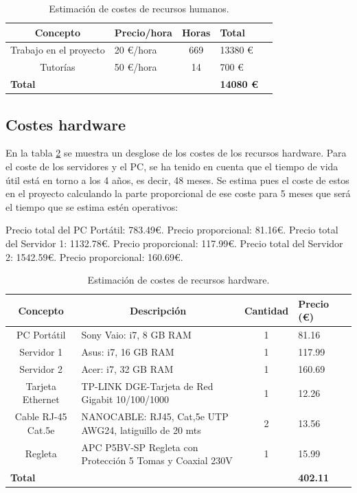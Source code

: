 \renewcommand\arraystretch{1.1}
\begin{table}[!h]
\centering
\begin{adjustbox}{max width=\textwidth}
\begin{tabular}{|c|l|c|l|c|}
\hline
\textbf{Concepto} & \textbf{Precio/hora} & \textbf{Horas} & \textbf{Total}   \\
\hline \hline
Trabajo en el proyecto & 20 \euro/hora & 669 & 13380 \euro \\
\hline
Tutorías & 50 \euro/hora & 14 & 700 \euro \\
\hline
\multicolumn{3}{|l|}{\textbf{Total}} & \textbf{14080 \euro} \\
\hline
\end{tabular}
\end{adjustbox}
\caption{Estimación de costes de recursos humanos.}
\label{tab:coste-recursos-humanos}
\end{table}


\subsection{Costes hardware}
En la tabla \ref{tab:costes-hardware} se muestra un desglose de los costes de los recursos hardware. Para el coste de los servidores y el PC, se ha tenido en cuenta que el tiempo de vida útil está en torno a los 4 años, es decir, 48 meses. Se estima pues el coste de estos en el proyecto calculando la parte proporcional de ese coste para 5 meses que será el tiempo que se estima estén operativos:

Precio total del PC Portátil: 783.49\euro. Precio proporcional: 81.16\euro.
Precio total del Servidor 1: 1132.78\euro. Precio proporcional: 117.99\euro.
Precio total del Servidor 2: 1542.59\euro. Precio proporcional: 160.69\euro.
\renewcommand\arraystretch{1.1}
\begin{table}[!h]
\centering
\begin{adjustbox}{max width=\textwidth}
\begin{tabular}{|c|l|c|l|c|}
\hline
\textbf{Concepto} &  \multicolumn{1}{|c|}{\textbf{Descripción}} & \textbf{Cantidad}  & \textbf{Precio (\euro)}  \\
\hline \hline
PC Portátil & Sony Vaio: i7, 8 GB RAM  & 1 & 81.16 \\
\hline
Servidor 1 & Asus: i7, 16 GB RAM & 1 & 117.99 \\
\hline
Servidor 2 & Acer: i7, 32 GB RAM & 1 & 160.69 \\
\hline
Tarjeta Ethernet & TP-LINK DGE-Tarjeta de Red Gigabit 10/100/1000
 & 1 & 12.26 \\
\hline
Cable RJ-45 Cat.5e & NANOCABLE: RJ45, Cat,5e UTP AWG24, latiguillo de 20 mts
 & 2 & 13.56 \\
\hline
Regleta & APC P5BV-SP Regleta con Protección 5 Tomas y Coaxial 230V
 & 1 & 15.99 \\
\hline
\multicolumn{3}{|l|}{\textbf{Total}} & \textbf{402.11} \\
\hline
\end{tabular}
\end{adjustbox}
\caption{Estimación de costes de recursos hardware.}
\label{tab:costes-hardware}
\end{table}



